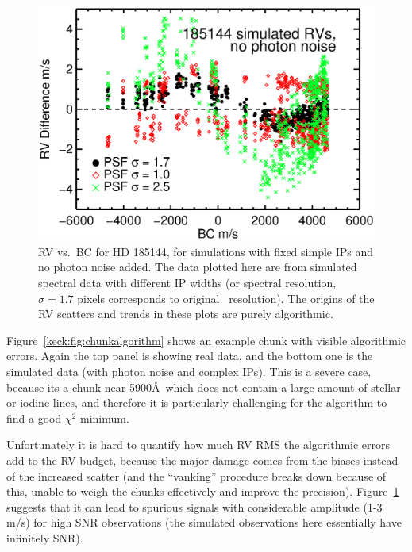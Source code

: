 \begin{figure}
\centering
\includegraphics[scale=0.65]{telluric/185144-rv-bc-rja01-rje01-rjf01.eps} 
\caption{RV vs.\ BC for HD 185144, for simulations with fixed simple
IPs and no photon noise added. The data plotted here are from
simulated spectral data with different IP widths (or spectral
resolution, $\sigma=1.7$ pixels corresponds to original \keck\
resolution). The origins of the RV scatters and trends in these plots
are purely algorithmic.
\label{keck:fig:algorithm}}
\end{figure}

Figure~\ref{keck:fig:chunkalgorithm} shows an example chunk with
visible algorithmic errors. Again the top panel is showing real data,
and the bottom one is the simulated data (with photon noise and
complex IPs). This is a severe case, because its a chunk near 5900\AA\
which does not contain a large amount of stellar or iodine lines, and
therefore it is particularly challenging for the algorithm to find a
good $\chi^2$ minimum.

Unfortunately it is hard to quantify how much RV RMS the algorithmic
errors add to the RV budget, because the major damage comes from the
biases instead of the increased scatter (and the ``vanking'' procedure
breaks down because of this, unable to weigh the chunks effectively
and improve the precision). Figure~\ref{keck:fig:algorithm} suggests
that it can lead to spurious signals with considerable amplitude (1-3
m/s) for high SNR observations (the simulated observations here
essentially have infinitely SNR).


